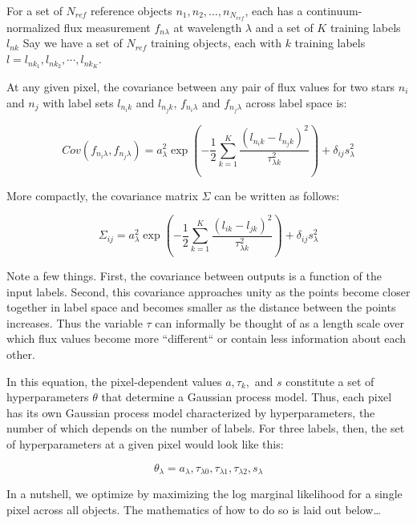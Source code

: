 \documentclass[12pt, preprint]{aastex}
\begin{document}
For a set of $N_{ref}$ reference objects $n_1, n_2, \dots, n_{N_{ref}}$, 
each has a continuum-normalized
flux measurement $f_{n \lambda}$ at wavelength $\lambda$ and a set of  
$K$ training labels $l_{nk}$ 
Say we have a set of $N_{ref}$ training objects, each with $k$ training labels 
$l = l_{nk_1}, l_{nk_2}, \cdots, l_{nk_K}$.

At any given pixel, the covariance between any pair of flux values for two
stars $n_i$ and $n_j$ with label sets $l_{n_i k}$ and $l_{n_j k}$, 
$ f_{n_i \lambda}$ and $f_{n_j \lambda}$ across label space is: 

\begin{equation}
  Cov(f_{n_i \lambda}, f_{n_j \lambda}) = 
  a_\lambda^2 \exp(-\frac{1}{2} 
  \sum_{k=1}^K \frac{(l_{n_i k}-l_{n_j k})^2}{\tau_{\lambda k}^2}) +
  \delta_{ij} s_\lambda^2
\end{equation}

More compactly, the covariance matrix $\Sigma$ can be written as follows:

\begin{equation}
  \Sigma_{ij} = 
  a_\lambda^2 \exp(-\frac{1}{2} 
  \sum_{k=1}^K \frac{(l_{i k}-l_{j k})^2}{\tau_{\lambda k}^2}) +
  \delta_{ij} s_\lambda^2
\end{equation}

Note a few things. First, the covariance between outputs is a function of the 
input labels. Second, this covariance approaches unity as the points become 
closer together in label space and becomes smaller as the distance between 
the points increases. Thus the variable $\tau$ can informally be thought of 
as a length scale over which flux values become more ``different`` or contain 
less information about each other.

In this equation, the pixel-dependent values $a, \tau_k, $ and $s$ constitute
a set of hyperparameters $\theta$ that determine a Gaussian process model. Thus, 
each pixel has its own Gaussian process model characterized by hyperparameters,
the number of which depends on the number of labels. For three labels, then,
the set of hyperparameters at a given pixel would look like this:

\begin{equation}
  \theta_\lambda = a_\lambda, 
  \tau_{\lambda 0}, \tau_{\lambda 1}, \tau_{\lambda 2}, s_\lambda
\end{equation}

In a nutshell, we optimize by maximizing the log marginal likelihood for a 
single pixel across all objects. The mathematics of how to do so is laid out 
below\ldots
\end{document}
